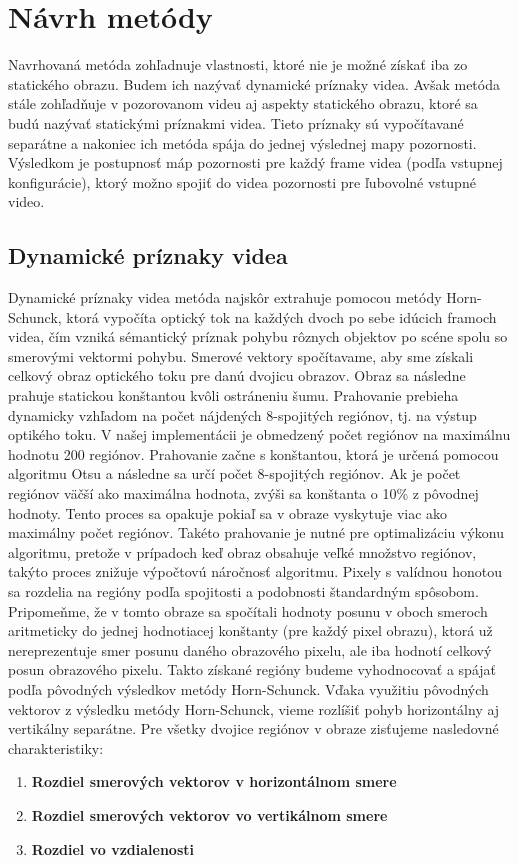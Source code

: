 \section{Návrh metódy}
Navrhovaná metóda zohľadnuje vlastnosti, ktoré nie je možné získať iba zo statického obrazu.
Budem ich nazývať dynamické príznaky videa.
Avšak metóda stále zohľadňuje v pozorovanom videu aj aspekty statického obrazu, ktoré sa budú nazývať statickými príznakmi videa.
Tieto príznaky sú vypočítavané separátne a nakoniec ich metóda spája do jednej výslednej mapy pozornosti. Výsledkom je postupnosť máp pozornosti pre každý frame videa (podľa vstupnej konfigurácie), ktorý možno spojiť do videa pozornosti pre ľubovolné vstupné video.

\subsection{Dynamické príznaky videa}
Dynamické príznaky videa metóda najskôr extrahuje pomocou metódy Horn-Schunck\cite{hs-original}, ktorá vypočíta optický tok na každých dvoch po sebe idúcich framoch videa, čím vzniká sémantický príznak pohybu rôznych objektov po scéne spolu so smerovými vektormi pohybu.
Smerové vektory spočítavame, aby sme získali celkový obraz optického toku pre danú dvojicu obrazov.
Obraz sa následne prahuje statickou konštantou kvôli ostráneniu šumu.
Prahovanie prebieha dynamicky vzhľadom na počet nájdených 8-spojitých regiónov, tj. na výstup optikého toku.
V našej implementácii je obmedzený počet regiónov na maximálnu hodnotu 200 regiónov.
Prahovanie začne s konštantou, ktorá je určená pomocou algoritmu Otsu\cite{otsu} a následne sa určí počet 8-spojitých regiónov. Ak je počet regiónov väčší ako maximálna hodnota, zvýši sa konštanta o 10\% z pôvodnej hodnoty.
Tento proces sa opakuje pokiaľ sa v obraze vyskytuje viac ako maximálny počet regiónov.
Takéto prahovanie je nutné pre optimalizáciu výkonu algoritmu, pretože v prípadoch keď obraz obsahuje veľké množstvo regiónov, takýto proces znižuje výpočtovú náročnosť algoritmu.
Pixely s valídnou honotou sa rozdelia na regióny podľa spojitosti a podobnosti štandardným spôsobom.
Pripomeňme, že v tomto obraze sa spočítali hodnoty posunu v oboch smeroch aritmeticky do jednej hodnotiacej konštanty (pre každý pixel obrazu), ktorá už nereprezentuje smer posunu daného obrazového pixelu, ale iba hodnotí celkový posun obrazového pixelu.
Takto získané regióny budeme vyhodnocovať a spájať podľa pôvodných výsledkov metódy Horn-Schunck.
Vďaka využitiu pôvodných vektorov z výsledku metódy Horn-Schunck, vieme rozlíšiť pohyb horizontálny aj vertikálny separátne.
Pre všetky dvojice regiónov v obraze zisťujeme nasledovné charakteristiky:
\begin{enumerate}
  \item\textbf{Rozdiel smerových vektorov v horizontálnom smere}
  \item\textbf{Rozdiel smerových vektorov vo vertikálnom smere}
  \item\textbf{Rozdiel vo vzdialenosti}
\end{enumerate}

